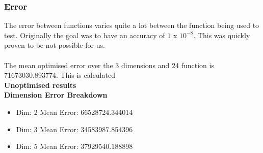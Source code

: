 \documentclass[12pt]{article}
\begin{document}
\subsubsection{Error}
The error between functions varies quite a lot between the function being used to test. Originally the goal was to have an accuracy of $1$ x $10^{-8}$. This was quickly proven to be not possible for us. \\\\
The mean optimised error over the 3 dimensions and 24 function is 71673030.893774. This is calculated\\

\quad\textbf{Unoptimised results}\\

\textbf{Dimension Error Breakdown}
\begin{itemize}
\item Dim: 2  Mean Error: 66528724.344014
\item Dim: 3  Mean Error: 34583987.854396
\item Dim: 5  Mean Error: 37929540.188898
\end{itemize}
\end{document}

